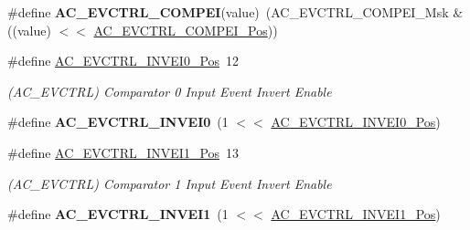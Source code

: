 \begin{DoxyCompactItemize}
\item 
\hypertarget{group___s_a_m_l21___a_c_ga76a37d2193149d76c4fffe6ca4372c97}{}\#define {\bfseries A\+C\+\_\+\+E\+V\+C\+T\+R\+L\+\_\+\+C\+O\+M\+P\+E\+I}(value)~(A\+C\+\_\+\+E\+V\+C\+T\+R\+L\+\_\+\+C\+O\+M\+P\+E\+I\+\_\+\+Msk \& ((value) $<$$<$ \hyperlink{group___s_a_m_l21___a_c_ga3ecb80c6d080322ab734ade29f0fb26e}{A\+C\+\_\+\+E\+V\+C\+T\+R\+L\+\_\+\+C\+O\+M\+P\+E\+I\+\_\+\+Pos}))\label{group___s_a_m_l21___a_c_ga76a37d2193149d76c4fffe6ca4372c97}

\item 
\hypertarget{group___s_a_m_l21___a_c_gac5b3dfa3ee04752686c12a34effd852b}{}\#define \hyperlink{group___s_a_m_l21___a_c_gac5b3dfa3ee04752686c12a34effd852b}{A\+C\+\_\+\+E\+V\+C\+T\+R\+L\+\_\+\+I\+N\+V\+E\+I0\+\_\+\+Pos}~12\label{group___s_a_m_l21___a_c_gac5b3dfa3ee04752686c12a34effd852b}

\begin{DoxyCompactList}\small\item\em (A\+C\+\_\+\+E\+V\+C\+T\+R\+L) Comparator 0 Input Event Invert Enable \end{DoxyCompactList}\item 
\hypertarget{group___s_a_m_l21___a_c_ga8f64f7444f25263d1b9ba660d1ca30c4}{}\#define {\bfseries A\+C\+\_\+\+E\+V\+C\+T\+R\+L\+\_\+\+I\+N\+V\+E\+I0}~(1 $<$$<$ \hyperlink{group___s_a_m_l21___a_c_gac5b3dfa3ee04752686c12a34effd852b}{A\+C\+\_\+\+E\+V\+C\+T\+R\+L\+\_\+\+I\+N\+V\+E\+I0\+\_\+\+Pos})\label{group___s_a_m_l21___a_c_ga8f64f7444f25263d1b9ba660d1ca30c4}

\item 
\hypertarget{group___s_a_m_l21___a_c_ga4f2994930271c93cb896b8370ef41b00}{}\#define \hyperlink{group___s_a_m_l21___a_c_ga4f2994930271c93cb896b8370ef41b00}{A\+C\+\_\+\+E\+V\+C\+T\+R\+L\+\_\+\+I\+N\+V\+E\+I1\+\_\+\+Pos}~13\label{group___s_a_m_l21___a_c_ga4f2994930271c93cb896b8370ef41b00}

\begin{DoxyCompactList}\small\item\em (A\+C\+\_\+\+E\+V\+C\+T\+R\+L) Comparator 1 Input Event Invert Enable \end{DoxyCompactList}\item 
\hypertarget{group___s_a_m_l21___a_c_gab71ead0086eda6da2b352236c25615e5}{}\#define {\bfseries A\+C\+\_\+\+E\+V\+C\+T\+R\+L\+\_\+\+I\+N\+V\+E\+I1}~(1 $<$$<$ \hyperlink{group___s_a_m_l21___a_c_ga4f2994930271c93cb896b8370ef41b00}{A\+C\+\_\+\+E\+V\+C\+T\+R\+L\+\_\+\+I\+N\+V\+E\+I1\+\_\+\+Pos})\label{group___s_a_m_l21___a_c_gab71ead0086eda6da2b352236c25615e5}


\end{DoxyCompactItemize}
